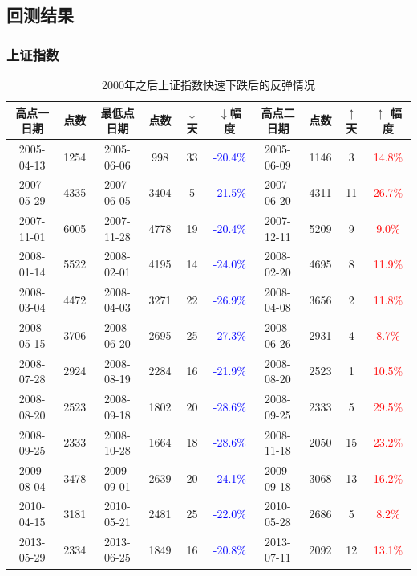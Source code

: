 \documentclass[12pt,a4paper]{article}
\begin{document}
\subsection{回测结果}


\subsubsection{上证指数}
\begin{table}[H]
\centering  %
\begin{tabular}{|c|c|c|c|c|c|c|c|c|c|}  %
\hline
高点一日期 & 点数 & 最低点日期 & 点数 & $\downarrow$ 天 &$\downarrow$幅度 & 高点二日期 & 点数 & $\uparrow$天& $\uparrow$ 幅度 \\ \hline
2005-04-13 & 1254 & 2005-06-06 & 998 & 33 & \textcolor{blue}{-20.4\%} & 2005-06-09 & 1146 & 3 & \textcolor{red}{14.8\%}  \\  \hline
2007-05-29 & 4335 & 2007-06-05 & 3404 & 5 & \textcolor{blue}{-21.5\%} & 2007-06-20 & 4311 & 11 & \textcolor{red}{26.7\%}  \\  \hline
2007-11-01 & 6005 & 2007-11-28 & 4778 & 19 & \textcolor{blue}{-20.4\%} & 2007-12-11 & 5209 & 9 & \textcolor{red}{9.0\%}  \\  \hline
2008-01-14 & 5522 & 2008-02-01 & 4195 & 14 & \textcolor{blue}{-24.0\%} & 2008-02-20 & 4695 & 8 & \textcolor{red}{11.9\%}  \\  \hline
2008-03-04 & 4472 & 2008-04-03 & 3271 & 22 & \textcolor{blue}{-26.9\%} & 2008-04-08 & 3656 & 2 & \textcolor{red}{11.8\%}  \\  \hline
2008-05-15 & 3706 & 2008-06-20 & 2695 & 25 & \textcolor{blue}{-27.3\%} & 2008-06-26 & 2931 & 4 & \textcolor{red}{8.7\%}  \\  \hline
2008-07-28 & 2924 & 2008-08-19 & 2284 & 16 & \textcolor{blue}{-21.9\%} & 2008-08-20 & 2523 & 1 & \textcolor{red}{10.5\%}  \\  \hline
2008-08-20 & 2523 & 2008-09-18 & 1802 & 20 & \textcolor{blue}{-28.6\%} & 2008-09-25 & 2333 & 5 & \textcolor{red}{29.5\%}  \\  \hline
2008-09-25 & 2333 & 2008-10-28 & 1664 & 18 & \textcolor{blue}{-28.6\%} & 2008-11-18 & 2050 & 15 & \textcolor{red}{23.2\%}  \\  \hline
2009-08-04 & 3478 & 2009-09-01 & 2639 & 20 & \textcolor{blue}{-24.1\%} & 2009-09-18 & 3068 & 13 & \textcolor{red}{16.2\%}  \\  \hline
2010-04-15 & 3181 & 2010-05-21 & 2481 & 25 & \textcolor{blue}{-22.0\%} & 2010-05-28 & 2686 & 5 & \textcolor{red}{8.2\%}  \\  \hline
2013-05-29 & 2334 & 2013-06-25 & 1849 & 16 & \textcolor{blue}{-20.8\%} & 2013-07-11 & 2092 & 12 & \textcolor{red}{13.1\%}  \\  \hline




\end{tabular}
\caption{2000年之后上证指数快速下跌后的反弹情况}
\end{table}
\end{document}
